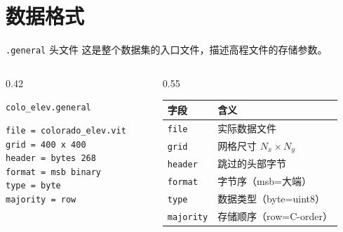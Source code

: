 \documentclass[aspectratio=169,11pt]{ctexbeamer}
\begin{document}
\section{数据格式}

\begin{frame}[fragile]{\texttt{.general} 头文件}
  这是整个数据集的入口文件，描述高程文件的存储参数。

  \begin{columns}
    \begin{column}{0.42\linewidth}
      \begin{block}{\texttt{colo\_elev.general}}
\begin{Verbatim}[fontsize=\tiny]
file = colorado_elev.vit
grid = 400 x 400
header = bytes 268
format = msb binary
type = byte
majority = row
\end{Verbatim}
      \end{block}
    \end{column}
    \begin{column}{0.55\linewidth}
      \begin{table}
        \centering
        \begin{tabularx}{\linewidth}{lX}
          \toprule
          字段 & 含义 \\
          \midrule
          \texttt{file} & 实际数据文件 \\
          \texttt{grid} & 网格尺寸 $N_x\times N_y$ \\
          \texttt{header} & 跳过的头部字节 \\
          \texttt{format} & 字节序（msb=大端） \\
          \texttt{type} & 数据类型（byte=uint8） \\
          \texttt{majority} & 存储顺序（row=C-order） \\
          \bottomrule
        \end{tabularx}
      \end{table}
    \end{column}
  \end{columns}
\end{frame}
\end{document}
